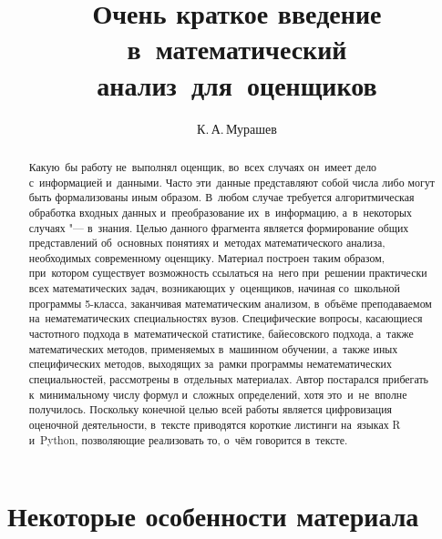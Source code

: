 \documentclass[]{scrartcl}
\title{Очень краткое введение в~математический анализ~для~оценщиков}
\author{К.\,А.\,Мурашев}
\begin{document}
\maketitle

\begin{abstract}
	Какую~бы работу не~выполнял оценщик, во~всех случаях он~имеет дело с~информацией и~данными. Часто эти~данные представляют собой числа либо могут быть формализованы иным образом. В~любом случае требуется алгоритмическая обработка входных данных и~преобразование их~в~информацию, а~в~некоторых случаях "--- в~знания. Целью данного фрагмента является формирование общих представлений об~основных понятиях и~методах математического анализа, необходимых современному оценщику. Материал построен таким образом, при~котором существует возможность ссылаться на~него при~решении практически всех математических задач, возникающих у~оценщиков, начиная со~школьной программы 5-класса, заканчивая математическим анализом, в~объёме преподаваемом на~нематематических специальностях вузов. Специфические вопросы, касающиеся частотного подхода в~математической статистике, байесовского подхода, а~также математических методов, применяемых в~машинном обучении, а~также иных специфических методов, выходящих за~рамки программы нематематических специальностей, рассмотрены в~отдельных материалах.  Автор постарался прибегать к~минимальному числу формул и~сложных определений, хотя это~и~не~вполне получилось. Поскольку конечной целью всей работы является цифровизация оценочной деятельности, в~тексте приводятся короткие листинги на~языках R и~Python, позволяющие реализовать то, о~чём говорится в~тексте. 
\end{abstract}

\tableofcontents
\section{Некоторые особенности материала}
\end{document}
